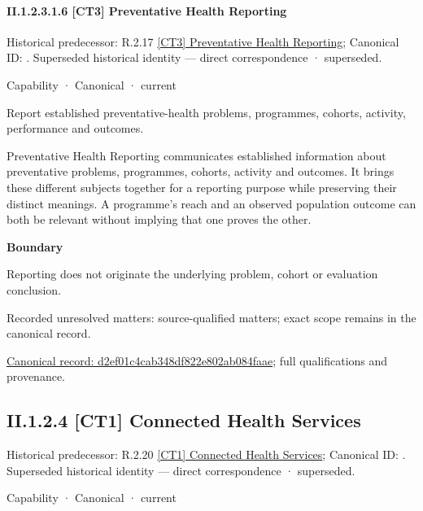 \paragraph*{II.1.2.3.1.6 [CT3] Preventative Health Reporting}
\label{navigation:II.1.2.3.1.6}

{\small Historical predecessor: R.2.17 \hyperref[element:4faef45b4ebe4fa69e57c3d81bfea05f]{[CT3] Preventative Health Reporting}; Canonical ID: \texttt{}. Superseded historical identity — direct correspondence · superseded.}\par
\label{element:d2ef01c4cab348df822e802ab084faae}
{\small Capability · Canonical · current}\par

Report established preventative-health problems, programmes, cohorts, activity, performance and outcomes.



Preventative Health Reporting communicates established information about preventative problems, programmes, cohorts, activity and outcomes. It brings these different subjects together for a reporting purpose while preserving their distinct meanings. A programme's reach and an observed population outcome can both be relevant without implying that one proves the other.



\textbf{Boundary}



Reporting does not originate the underlying problem, cohort or evaluation conclusion.


{\small Recorded unresolved matters: source-qualified matters; exact scope remains in the canonical record.}\par
{\footnotesize \href{../../../../continuum/strategy/capability/d2ef01c4cab348df822e802ab084faae.md}{Canonical record: d2ef01c4cab348df822e802ab084faae}; full qualifications and provenance.}\par
\subsection*{II.1.2.4 [CT1] Connected Health Services}
\label{navigation:II.1.2.4}

{\small Historical predecessor: R.2.20 \hyperref[element:48f01ef8b0e6431c85cf4f40cf8f94c3]{[CT1] Connected Health Services}; Canonical ID: \texttt{}. Superseded historical identity — direct correspondence · superseded.}\par
\label{element:3ef397463e584737b367e93f0bf1d85d}
{\small Capability · Canonical · current}\par

